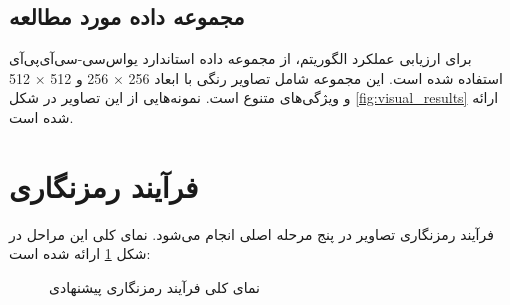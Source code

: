 \subsection{مجموعه داده مورد مطالعه}
برای ارزیابی عملکرد الگوریتم، از مجموعه داده استاندارد یو‌اس‌سی-سی‌آی‌پی‌آی\protect{} استفاده شده است. این مجموعه شامل تصاویر رنگی با ابعاد 256 × 256 و 512 × 512 و ویژگی‌های متنوع است. نمونه‌هایی از این تصاویر در شکل \ref{fig:visual_results} ارائه شده است.

\section{فرآیند رمزنگاری}
فرآیند رمزنگاری تصاویر در پنج مرحله اصلی انجام می‌شود. نمای کلی این مراحل در شکل \ref{fig:encryption_pipeline} ارائه شده است:

\begin{figure}[h!]
\centering
\begin{latin}
\small
{}
\end{latin}
\caption{نمای کلی فرآیند رمزنگاری پیشنهادی} \label{fig:encryption_pipeline}
\end{figure}

